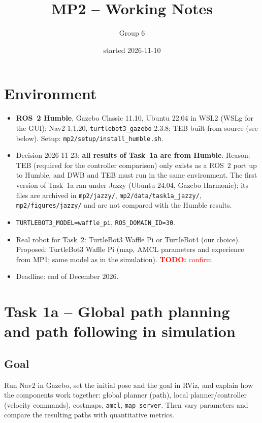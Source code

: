 \documentclass[10pt]{article}
\title{MP2 -- Working Notes}
\author{Group 6}
\date{started 2026-11-10}
\newcommand{\todo}[1]{\textcolor{red}{\textbf{TODO:} #1}}
\newcommand{\pkg}[1]{\texttt{#1}}
\begin{document}
\maketitle

\section{Environment}
\begin{itemize}
  \item \textbf{ROS~2 Humble}, Gazebo Classic 11.10, Ubuntu 22.04 in WSL2 (WSLg for the GUI); Nav2 1.1.20,
        \pkg{turtlebot3\_gazebo} 2.3.8; TEB built from source (see below). Setup: \pkg{mp2/setup/install\_humble.sh}.
  \item Decision 2026-11-23: \textbf{all results of Task~1a are from Humble}. Reason: TEB (required for the
        controller comparison) only exists as a ROS~2 port up to Humble, and DWB and TEB must run in the same
        environment. The first version of Task~1a ran under Jazzy (Ubuntu 24.04, Gazebo Harmonic); its files are
        archived in \pkg{mp2/jazzy/}, \pkg{mp2/data/task1a\_jazzy/}, \pkg{mp2/figures/jazzy/} and are not compared
        with the Humble results.
  \item \pkg{TURTLEBOT3\_MODEL=waffle\_pi}, \pkg{ROS\_DOMAIN\_ID=30}.
  \item Real robot for Task~2: TurtleBot3 Waffle Pi or TurtleBot4 (our choice). Proposed: TurtleBot3 Waffle Pi
        (map, AMCL parameters and experience from MP1; same model as in the simulation). \todo{confirm}
  \item Deadline: end of December 2026.
\end{itemize}

\section{Task 1a -- Global path planning and path following in simulation}

\subsection{Goal}
Run Nav2 in Gazebo, set the initial pose and the goal in RViz, and explain how the
components work together: global planner (path), local planner/controller (velocity
commands), costmaps, \pkg{amcl}, \pkg{map\_server}. Then vary parameters and compare
the resulting paths with quantitative metrics.
\end{document}
